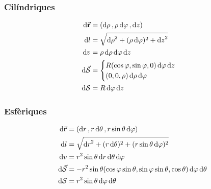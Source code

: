 \subsubsection*{Cilíndriques}
\begin{align*}
	\begin{aligned}
		\dd{\va{r}} &= (\dd{\rho}, \rho \dd{\varphi}, \dd{z}) \\
		\dd{l} &= \sqrt{\dd{\rho}^{2} + (\rho \dd{\varphi})^{2} + \dd{z}^{2}} \\
		\dd{v} &= \rho \dd{\rho} \dd{\varphi} \dd{z} \\
		\dd{\va{\mathcal{S}}} &= \begin{cases} R (\cos \varphi, \sin \varphi, 0) \dd{\varphi} \dd{z} \\ (0, 0, \rho) \dd{\rho} \dd{\varphi} \end{cases} \\
		\dd{\mathcal{S}} &= R \dd{\varphi} \dd{z} \\
	\end{aligned}
\end{align*}

\subsubsection*{Esfèriques}
\begin{align*}
	\begin{aligned}
		\dd{\va{r}} &= (\dd{r}, r \dd{\theta}, r \sin \theta \dd{\varphi}) \\
		\dd{l} &= \sqrt{\dd{r}^{2} + (r \dd{\theta})^{2} + (r \sin \theta \dd{\varphi})^{2}} \\
		\dd{v} &= r^{2} \sin \theta \dd{r} \dd{\theta} \dd{\varphi} \\
		\dd{\va{\mathcal{S}}} &= - r^{2} \sin \theta ( \cos \varphi \sin \theta , \sin \varphi \sin \theta , \cos \theta) \dd{\varphi} \dd{\theta} \\
		\dd{\mathcal{S}} &= r^{2} \sin \theta \dd{\varphi} \dd{\theta} \\
	\end{aligned}
\end{align*}
